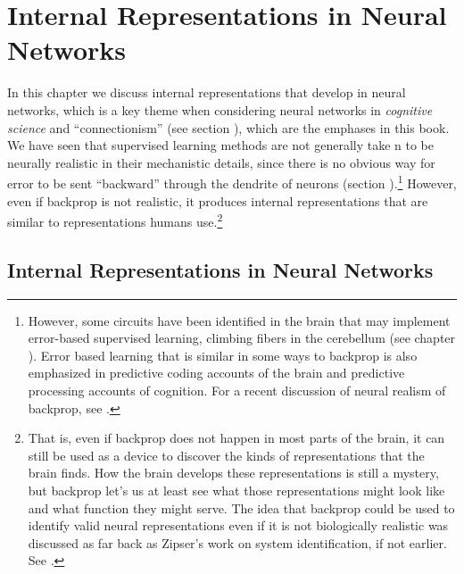 \chapter{Internal Representations in Neural Networks}\label{ch_representations}

In this chapter we discuss internal representations that develop in neural networks, which is a key theme when considering neural networks in \emph{cognitive science} and ``connectionism'' (see section ), which are the emphases in this book. We have seen that  supervised learning methods are not generally take	n to be neurally realistic in their mechanistic details, since there is no obvious way for error to be sent ``backward'' through the dendrite of neurons (section ).\footnote{However, some circuits have been identified in the brain that may implement error-based supervised learning, \eg climbing fibers in the cerebellum (see chapter ). Error based learning that is similar in some ways to backprop is also emphasized in predictive coding accounts of the brain and predictive processing accounts of cognition. For a  recent discussion of neural realism of backprop, see \cite{whittington2019theories}.}  However, even if backprop is not realistic, it produces internal representations that are similar to representations humans use.\footnote{That is, even if backprop does not happen in most parts of the brain, it can still be used as a device to discover the kinds of representations that the brain finds. How the brain develops these representations is still a mystery, but backprop let's us at least see what those representations might look like and what function they might serve. The idea that backprop could be used to identify valid neural representations even if it is not biologically realistic was discussed as far back as Zipser's work on system identification, if not earlier. See \cite{zipser1992identification}.}

\section{Internal Representations in Neural Networks}


